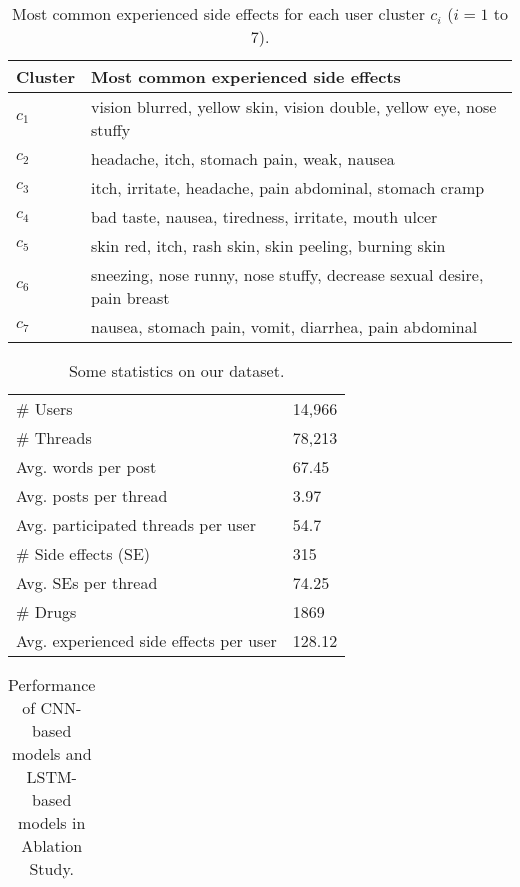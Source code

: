 \documentclass{bmcart}
\begin{document}
\begin{backmatter}
\begin{table}[h!]
    \caption{Most common experienced side effects for each user cluster $c_{i}$ ($i=1$ to $7$).}
    \begin{tabular}{l l} \hline
        Cluster & Most common experienced side effects \\ \hline
        $c_{1}$ & vision blurred, yellow skin, vision double, yellow eye, nose stuffy \\
        $c_{2}$ & headache, itch, stomach pain, weak, nausea \\
        $c_{3}$ & itch, irritate, headache, pain abdominal, stomach cramp \\
        $c_{4}$ & bad taste, nausea, tiredness, irritate, mouth ulcer \\
        $c_{5}$ & skin red, itch, rash skin, skin peeling, burning skin \\
        $c_{6}$ & sneezing, nose runny, nose stuffy, decrease sexual desire, pain breast \\
        $c_{7}$ & nausea, stomach pain, vomit, diarrhea, pain abdominal \\ \hline
    \end{tabular}
    \label{table:cluster_results}
\end{table}
\begin{table}[h!]
    \caption{Some statistics on our dataset.}
    \begin{tabular}{l l} \hline
        \# Users & 14,966 \\
        \# Threads & 78,213 \\
        Avg. words per post & 67.45 \\
        Avg. posts per thread & 3.97 \\
        Avg. participated threads per user & 54.7 \\
        \# Side effects (SE) & 315 \\
        Avg. SEs per thread & 74.25 \\
        \# Drugs & 1869 \\
        Avg. experienced side effects per user & 128.12 \\ \hline
    \end{tabular}
    \label{table:dataset_statistics}
\end{table}
\begin{table}[h!]
    \caption{Performance of CNN-based models and LSTM-based models in Ablation Study.}
  \scalebox{1.2}
  \footnotesize
  \begin{tabular}{l | c c c | c c c}

\end{tabular}
\end{table}
\end{backmatter}
\end{document}
